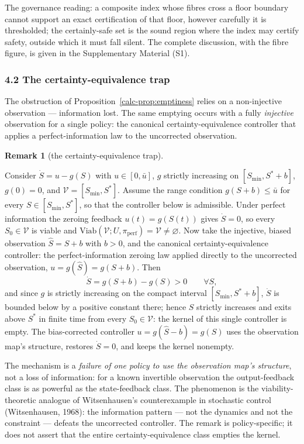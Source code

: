 \documentclass[10pt,twocolumn]{article}
\theoremstyle{definition}
\newtheorem{remark}{Remark}
\begin{document}
The governance reading: a composite index whose fibres cross a floor boundary cannot support an exact certification of that floor, however carefully it is thresholded; the certainly-safe set is the sound region where the index may certify safety, outside which it must fall silent. The complete discussion, with the fibre figure, is given in the Supplementary Material (S1).

\subsubsection{4.2 The certainty-equivalence
trap}\label{calc-the-certainty-equivalence-trap}

The obstruction of Proposition~\ref{calc-prop:emptiness} relies on a non-injective observation ---
information lost. The same emptying occurs with a fully
\emph{injective} observation for a single policy: the canonical
certainty-equivalence controller that applies a perfect-information law
to the uncorrected observation.

\begin{remark}[the certainty-equivalence trap]\label{calc-rem:ce-trap}

Consider \(\dot S = u - g(S)\) with \(u \in [0, \bar u]\), \(g\) strictly
increasing on \([S_{\min}, S^* + b]\), \(g(0) = 0\), and
\(\mathcal{V} = [S_{\min}, S^*]\). Assume the range condition
\(g(S + b) \le \bar u\) for every \(S \in [S_{\min}, S^*]\), so that the
controller below is admissible. Under perfect information the zeroing
feedback \(u(t) = g(S(t))\) gives \(\dot S = 0\), so every
\(S_0 \in \mathcal{V}\) is viable and
\(\mathrm{Viab}(\mathcal{V}; U, \pi_{\mathrm{perf}}) = \mathcal{V} \neq \varnothing\).
Now take the injective, biased observation \(\hat S = S + b\) with
\(b > 0\), and the canonical certainty-equivalence controller: the
perfect-information zeroing law applied directly to the uncorrected
observation, \(u = g(\hat S) = g(S + b)\). Then
\[\dot S = g(S + b) - g(S) > 0 \qquad \forall S,\]
and since \(g\) is strictly increasing on the compact interval
\([S_{\min}, S^* + b]\), \(\dot S\) is bounded below by a positive
constant there; hence \(S\) strictly increases and exits above \(S^*\) in
finite time from every \(S_0 \in \mathcal{V}\): the kernel of this single
controller is empty. The bias-corrected controller
\(u = g(\hat S - b) = g(S)\) uses the observation map's structure, restores
\(\dot S = 0\), and keeps the kernel nonempty.

The mechanism is a \emph{failure of one policy to use the observation
map's structure}, not a loss of information: for a known invertible
observation the output-feedback class is as powerful as the
state-feedback class. The phenomenon is the viability-theoretic analogue
of Witsenhausen's counterexample in stochastic control (Witsenhausen,
1968): the information pattern --- not the dynamics and not the
constraint --- defeats the uncorrected controller. The remark is
policy-specific; it does not assert that the entire certainty-equivalence
class empties the kernel.

\end{remark}
\end{document}
